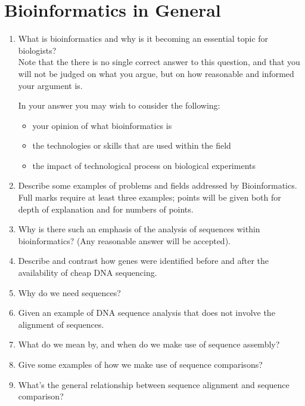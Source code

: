 \documentclass[11pt]{article}
\begin{document}
\section{Bioinformatics in General}
\begin{enumerate}
\item What is bioinformatics and why is it becoming an essential topic for
  biologists?\\
  Note that the there is no single correct answer to this question, and that
  you will not be judged on what you argue, but on how reasonable and informed
  your argument is.
  
  In your answer you may wish to consider the following:
  \begin{itemize}
  \item your opinion of what bioinformatics is
  \item the technologies or skills that are used within the field
  \item the impact of technological process on biological experiments
  \end{itemize}
  \item Describe some examples of problems and fields addressed by
    Bioinformatics. Full marks require at least three examples; points
    will be given both for depth of explanation and for numbers of points.
  \item Why is there such an emphasis of the analysis of sequences within
    bioinformatics? (Any reasonable answer will be accepted).
  \item Describe and contrast how genes were identified before and after the
    availability of cheap DNA sequencing.
  \item Why do we need sequences?
  \item Given an example of DNA sequence analysis that does not involve the
    alignment of sequences.
  \item What do we mean by, and when do we make use of sequence assembly?
  \item Give some examples of how we make use of sequence comparisons?
  \item What's the general relationship between sequence alignment and
    sequence comparison?
\end{enumerate}
\end{document}
